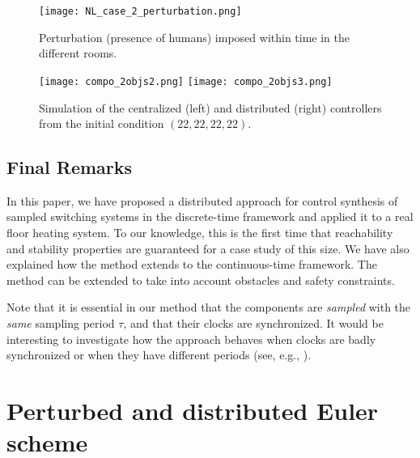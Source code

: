 \begin{figure}[ht]
 \centering
 \texttt{[image: NL\_case\_2\_perturbation.png]}
 \caption{Perturbation (presence of humans) imposed within time in the
   different rooms.}
  \label{fig:NL_2_part3_perturbation_part3}
\end{figure}


\begin{figure}[ht]
 \centering
 \texttt{[image: compo\_2objs2.png]}%
%
 \texttt{[image: compo\_2objs3.png]}
 \caption{Simulation of the centralized (left) and distributed (right) controllers from the initial condition $(22,22,22,22)$.}
  \label{fig:NL_2_part3}
\end{figure}

\subsection{Final Remarks}\label{sec:conc}

In this paper, we have proposed a distributed approach 
for control synthesis of sampled switching systems in the discrete-time framework
and applied it to a real floor heating system.
To our knowledge,
this is the first time that reachability and stability properties  
are guaranteed for a case study of this size. 
We have also explained how the method extends to the continuous-time framework.
The method can
be extended to take into account obstacles and safety constraints.

Note that it is essential in our method that the components are {\em sampled} with the {\em same} sampling period $\tau$, and that their clocks are synchronized.
It would be interesting to investigate how the approach behaves when clocks are badly synchronized or when they have different periods (see, e.g., \cite{KhatibGD16}).




\section{Perturbed and distributed Euler scheme}

